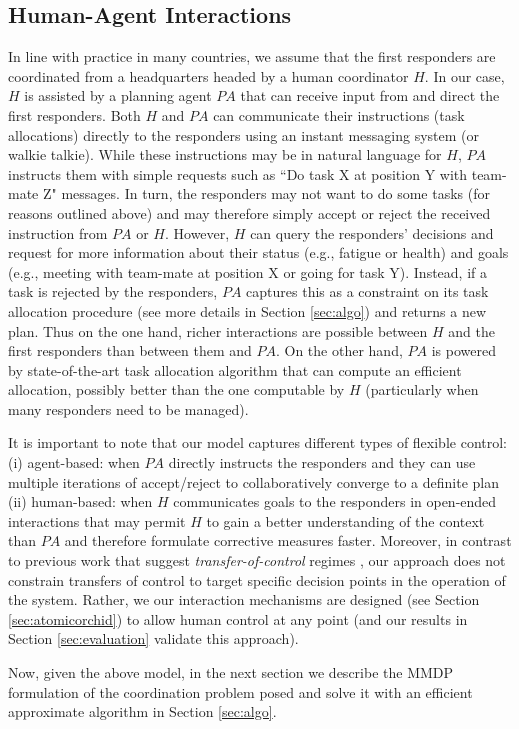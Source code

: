 \subsection{Human-Agent Interactions}
\noindent In line with practice in many countries, we assume that the first responders are coordinated from a headquarters headed by a human coordinator $H$. In our case, $H$ is assisted by a planning agent $PA$ that can receive input from and direct the first responders.   Both  $H$ and $PA$  can communicate their  instructions (task allocations) directly to the responders using an instant messaging system (or walkie talkie).  While these instructions may be in natural language for $H$, $PA$ instructs them with simple requests such as ``Do task X at position Y with team-mate Z" messages. In turn, the responders may not want to do some tasks (for reasons outlined above) and may therefore simply accept or reject the received instruction from $PA$ or $H$. However, $H$ can query the responders' decisions and request for more information about their status (e.g., fatigue or health) and goals (e.g., meeting with team-mate at position X or going for task Y). Instead, if a task is rejected by the responders, $PA$ captures this as a constraint on its task allocation procedure (see more details in Section \ref{sec:algo}) and returns a new plan. Thus on the one hand, richer interactions are possible between $H$ and the first responders than between them and $PA$. On the other hand, $PA$ is powered by state-of-the-art task allocation algorithm that can compute an efficient allocation, possibly better than the one computable by $H$ (particularly when many responders need to be managed). 

It is important to note that our model captures different types of flexible control: (i) agent-based: when $PA$ directly instructs the responders  and they can use multiple iterations of accept/reject to collaboratively converge to a definite  plan (ii) human-based: when $H$ communicates goals to the responders in open-ended interactions that may permit $H$ to gain a better understanding of the context than $PA$ and therefore formulate corrective measures faster. Moreover, in contrast to previous work that suggest \emph{transfer-of-control} regimes \cite{scerri:etal:2005}, our approach does not constrain transfers of control to target specific decision points in the operation of the system. Rather, we our interaction mechanisms are designed (see Section \ref{sec:atomicorchid}) to allow human control at any point (and our results  in Section \ref{sec:evaluation} validate this approach). 

Now, given the above model,  in the next section we describe the MMDP formulation of the coordination problem posed and solve it with an efficient approximate algorithm in Section \ref{sec:algo}.



